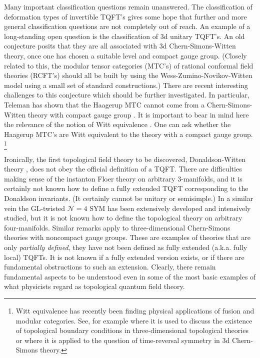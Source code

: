 \documentclass[12pt]{article}
\newcommand\CalN{\mathcal{N}}
\begin{document}
Many important classification questions remain unanswered. The
 classification of deformation types of invertible TQFT's \cite{Freed:2016rqq} gives some hope that
further and more general classification questions are not completely
out of reach.  An example of a long-standing open question is the classification of 3d unitary
TQFT's. An old conjecture \cite{Moore:1989vd} posits that they are all associated with
3d Chern-Simons-Witten theory, once one has chosen a suitable level and compact gauge group.
(Closely related to this, the modular tensor categories (MTC's)  of rational conformal field theories 
(RCFT's) should all be built by using the
Wess-Zumino-Novikov-Witten model \cite{Witten:1983ar} using a small set of standard
constructions.) There are recent interesting challenges to this conjecture
\cite{Evans:2010yr,EvansGannon-Tambara,Huang:2021nvb,Vanhove:2021zop} which should be further investigated.
In particular, Teleman has shown that the Haagerup MTC cannot come from 
a Chern-Simons-Witten theory with compact gauge group \cite{TelemanRemark}. It is important to bear in mind here the relevance of the notion of Witt equivalence
\cite{DavydovWitt1,DavydovWitt2}. 
One can ask whether the Haagerup MTC's are Witt equivalent to the theory with a compact gauge group. 
%
%
\footnote{Witt equivalence has recently been finding physical applications of fusion and modular categories. See, for example \cite{Freed:2020qfy} where it is used to discuss the existence of topological boundary conditions in three-dimensional topological theories or 
\cite{Geiko:2022qjy} where it is applied to the question of time-reversal symmetry in 3d Chern-Simons theory. }


Ironically, the first topological field theory to be discovered, 
Donaldson-Witten theory \cite{Witten:1988ze},
does not obey the official definition of a TQFT. There are difficulties making sense of the instanton Floer theory on arbitrary $3$-manifolds, and it is certainly not known how to define a fully extended TQFT corresponding to the Donaldson invariants.
(It certainly cannot be unitary \cite{Freedman:2005eqs} or semisimple.)
In a similar vein the  GL-twisted 
${\CalN}=4$ SYM \cite{Kapustin:2006pk}   has been extensively developed and intensively
studied, but it is not known how to define the topological theory on arbitrary four-manifolds.
Similar remarks apply to three-dimensional Chern-Simons theories with noncompact gauge groups. 
These are examples of theories that are only \emph{partially defined}, they have not been 
defined as fully extended (a.k.a. fully local) TQFTs. It is not known if a fully extended 
version exists, or if there are fundamental obstructions to such an extension. Clearly, there remain fundamental aspects to be understood even in some of the most basic examples of what physicists regard as topological quantum field theory. 
\end{document}
